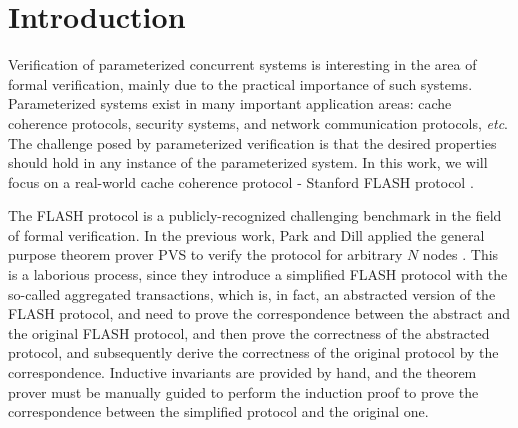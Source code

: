 \documentclass{llncs-new}
\newcommand\JP[1]{\textcolor{magenta}{JP: #1}}
\newcommand{\bedt}[1]{{\color{black}#1}}
\begin{document}
\section{Introduction}\label{sec:introduction}
\vspace{-5pt}
Verification of parameterized concurrent systems is interesting in
the area of formal \bedt{verification}, mainly due to the practical importance
of such systems. Parameterized systems exist in many important
application areas: cache coherence protocols, security systems, and
network communication protocols, \emph{etc}. The challenge posed by
parameterized verification is that the desired properties should
hold in any instance of the parameterized system. In this work, we will
focus on a real-world cache coherence protocol - Stanford FLASH protocol \cite{FLASHCache}. %

The FLASH protocol is a publicly-recognized challenging benchmark in the field of formal
 verification. In the previous   work,
Park and Dill applied the general purpose theorem prover PVS \cite{cade92-pvs}
to   verify the protocol for arbitrary $N$ nodes \cite{Park1996a}. This is a laborious process, since they introduce a simplified  FLASH protocol with the so-called aggregated transactions, which
is, in fact,  an abstracted version of the FLASH protocol, and  need to prove
the correspondence between the abstract and the original FLASH
protocol, and then prove the correctness of the abstracted protocol, and subsequently derive the correctness of  the
original protocol by the correspondence. %
Inductive invariants are provided by \bedt{hand}, and the theorem prover must be manually guided to perform the induction proof to prove the correspondence between the simplified protocol  and the original one. %
\end{document}
